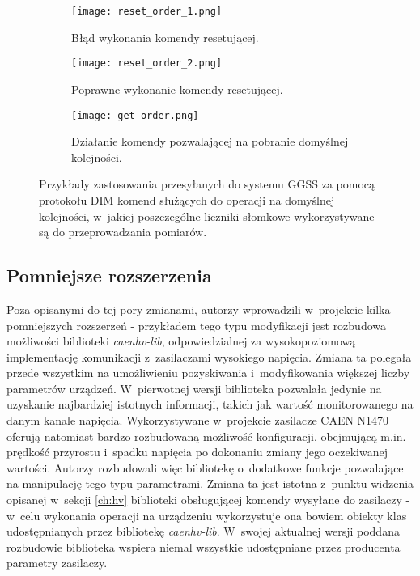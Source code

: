 \begin{figure}[H]
\centering

\begin{subfigure}{0.45\textwidth}
\centering
\texttt{[image: reset\_order\_1.png]}
\caption{Błąd wykonania komendy resetującej.}
\label{fig:order_com_1}
\end{subfigure}
\begin{subfigure}{0.45\textwidth}
\centering
\texttt{[image: reset\_order\_2.png]}
\caption{Poprawne wykonanie komendy resetującej.}
\label{fig:order_com_2}
\end{subfigure}

\vspace*{8pt}%

\begin{subfigure}{0.45\textwidth}
\centering
\texttt{[image: get\_order.png]}
\caption{Działanie komendy pozwalającej na pobranie domyślnej kolejności.}
\label{fig:order_com_3}
\end{subfigure}

\caption{Przykłady zastosowania przesyłanych do systemu GGSS za pomocą protokołu DIM komend służących do operacji na domyślnej kolejności, w~jakiej poszczególne liczniki słomkowe wykorzystywane są do przeprowadzania pomiarów.}
\label{fig:order_com}
\end{figure}


\subsection{Pomniejsze rozszerzenia}
Poza opisanymi do tej pory zmianami, autorzy wprowadzili w~projekcie kilka pomniejszych rozszerzeń - przykładem tego typu modyfikacji jest rozbudowa możliwości biblioteki \emph{caenhv-lib}, odpowiedzialnej za wysokopoziomową implementację komunikacji z~zasilaczami wysokiego napięcia. Zmiana ta polegała przede wszystkim na umożliwieniu pozyskiwania i~modyfikowania większej liczby parametrów urządzeń. W~pierwotnej wersji biblioteka pozwalała jedynie na uzyskanie najbardziej istotnych informacji, takich jak wartość monitorowanego na danym kanale napięcia. Wykorzystywane w~projekcie zasilacze CAEN N1470 oferują natomiast bardzo rozbudowaną możliwość konfiguracji, obejmującą m.in. prędkość przyrostu i~spadku napięcia po dokonaniu zmiany jego oczekiwanej wartości. Autorzy rozbudowali więc bibliotekę o~dodatkowe funkcje pozwalające na manipulację tego typu parametrami. Zmiana ta jest istotna z~punktu widzenia opisanej w~sekcji \ref{ch:hv} biblioteki obsługującej komendy wysyłane do zasilaczy - w~celu wykonania operacji na urządzeniu wykorzystuje ona bowiem obiekty klas udostępnianych przez bibliotekę \emph{caenhv-lib}. W~swojej aktualnej wersji poddana rozbudowie biblioteka wspiera niemal wszystkie udostępniane przez producenta parametry zasilaczy.
